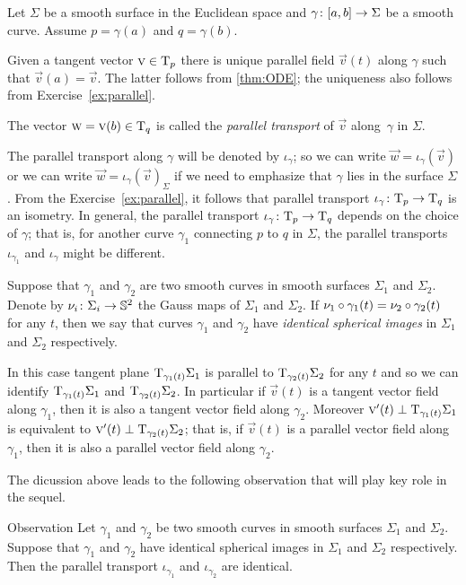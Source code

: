 Let $\Sigma$ be a smooth surface in the Euclidean space and $\gamma\:[a,b]\z\to \Sigma$ be a smooth curve.
Assume $p=\gamma(a)$ and $q=\gamma(b)$.

Given a tangent vector ${\text{\sc{v}}}\in\mathrm{T}_p$ there is unique parallel field ${\vec v}(t)$ along $\gamma$ such that ${\vec v}(a)={\vec v}$.
The latter follows from \ref{thm:ODE}; the uniqueness also follows from Exercise~\ref{ex:parallel}.

The vector $\text{\sc{w}}={\text{\sc{v}}}(b)\in\mathrm{T}_q$ is called the \emph{parallel transport} of ${\vec v}$ along~$\gamma$ in $\Sigma$.

The parallel transport along $\gamma$ will be denoted by $\iota_\gamma$;
so we can write $\vec w=\iota_\gamma({\vec v})$ or we can write $\vec w=\iota_\gamma({\vec v})_\Sigma$ if we need to emphasize that $\gamma$ lies in the surface $\Sigma$.
From the Exercise~\ref{ex:parallel}, it follows that parallel transport $\iota_\gamma\:\T_p\z\to\T_q$ is an isometry.
In general, the parallel transport $\iota_\gamma\:\T_p\z\to\T_q$ depends on the choice of $\gamma$; that is, for another curve $\gamma_1$ connecting $p$ to $q$ in $\Sigma$, the parallel transports $\iota_{\gamma_1}$ and $\iota_{\gamma}$ might be different.

Suppose that $\gamma_1$ and $\gamma_2$ are two smooth curves in smooth surfaces $\Sigma_1$ and $\Sigma_2$.
Denote by $\nu_i\colon\Sigma_i\to\mathbb{S}^2$ the Gauss maps of $\Sigma_1$ and $\Sigma_2$.
If $\nu_1\circ\gamma_1(t)= \nu_2\circ\gamma_2(t)$ for any $t$, then we say that curves $\gamma_1$ and $\gamma_2$ have {}\emph{identical spherical images} in $\Sigma_1$ and $\Sigma_2$ respectively.

In this case tangent plane $\mathrm{T}_{\gamma_1(t)}\Sigma_1$ is parallel to $\mathrm{T}_{\gamma_2(t)}\Sigma_2$ for any $t$ and so we can identify $\mathrm{T}_{\gamma_1(t)}\Sigma_1$ and $\mathrm{T}_{\gamma_2(t)}\Sigma_2$.
In particular if $\vec v(t)$ is a tangent vector field along $\gamma_1$,
then it is also a tangent vector field along $\gamma_2$.
Moreover $\text{\sc{v}}'(t)\perp \mathrm{T}_{\gamma_1(t)}\Sigma_1$ is equivalent to $\text{\sc{v}}'(t)\perp \mathrm{T}_{\gamma_2(t)}\Sigma_2$; that is, if $\vec v(t)$ is a parallel vector field along $\gamma_1$,
then it is also a parallel vector field along $\gamma_2$.

The dicussion above leads to the following observation that will play key role in the sequel.

\begin{thm}{Observation}\label{obs:parallel=}
Let $\gamma_1$ and $\gamma_2$ be two smooth curves in smooth surfaces $\Sigma_1$ and $\Sigma_2$.
Suppose that $\gamma_1$ and $\gamma_2$ have identical spherical images in $\Sigma_1$ and $\Sigma_2$ respectively.
Then the parallel transport $\iota_{\gamma_1}$ and $\iota_{\gamma_2}$ are identical. 
\end{thm}

